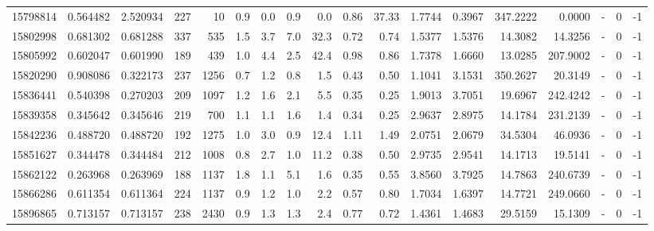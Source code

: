 \begin{tabular}{rrrrrrrrrrrrrrrlrr}
  15798814 & 0.564482 &   2.520934 &  227 &   10 &      0.9 &      0.0 &     0.9 &      0.0 &       0.86 &       37.33 &  1.7744 &  0.3967 &  347.2222 &    0.0000 &             - &        0 &         -1 \\
  15802998 & 0.681302 &   0.681288 &  337 &  535 &      1.5 &      3.7 &     7.0 &     32.3 &       0.72 &        0.74 &  1.5377 &  1.5376 &   14.3082 &   14.3256 &             - &        0 &         -1 \\
  15805992 & 0.602047 &   0.601990 &  189 &  439 &      1.0 &      4.4 &     2.5 &     42.4 &       0.98 &        0.86 &  1.7378 &  1.6660 &   13.0285 &  207.9002 &             - &        0 &         -1 \\
  15820290 & 0.908086 &   0.322173 &  237 & 1256 &      0.7 &      1.2 &     0.8 &      1.5 &       0.43 &        0.50 &  1.1041 &  3.1531 &  350.2627 &   20.3149 &             - &        0 &         -1 \\
  15836441 & 0.540398 &   0.270203 &  209 & 1097 &      1.2 &      1.6 &     2.1 &      5.5 &       0.35 &        0.25 &  1.9013 &  3.7051 &   19.6967 &  242.4242 &             - &        0 &         -1 \\
  15839358 & 0.345642 &   0.345646 &  219 &  700 &      1.1 &      1.1 &     1.6 &      1.4 &       0.34 &        0.25 &  2.9637 &  2.8975 &   14.1784 &  231.2139 &             - &        0 &         -1 \\
  15842236 & 0.488720 &   0.488720 &  192 & 1275 &      1.0 &      3.0 &     0.9 &     12.4 &       1.11 &        1.49 &  2.0751 &  2.0679 &   34.5304 &   46.0936 &             - &        0 &         -1 \\
  15851627 & 0.344478 &   0.344484 &  212 & 1008 &      0.8 &      2.7 &     1.0 &     11.2 &       0.38 &        0.50 &  2.9735 &  2.9541 &   14.1713 &   19.5141 &             - &        0 &         -1 \\
  15862122 & 0.263968 &   0.263969 &  188 & 1137 &      1.8 &      1.1 &     5.1 &      1.6 &       0.35 &        0.55 &  3.8560 &  3.7925 &   14.7863 &  240.6739 &             - &        0 &         -1 \\
  15866286 & 0.611354 &   0.611364 &  224 & 1137 &      0.9 &      1.2 &     1.0 &      2.2 &       0.57 &        0.80 &  1.7034 &  1.6397 &   14.7721 &  249.0660 &             - &        0 &         -1 \\
  15896865 & 0.713157 &   0.713157 &  238 & 2430 &      0.9 &      1.3 &     1.3 &      2.4 &       0.77 &        0.72 &  1.4361 &  1.4683 &   29.5159 &   15.1309 &             - &        0 &         -1 \\

\end{tabular}
